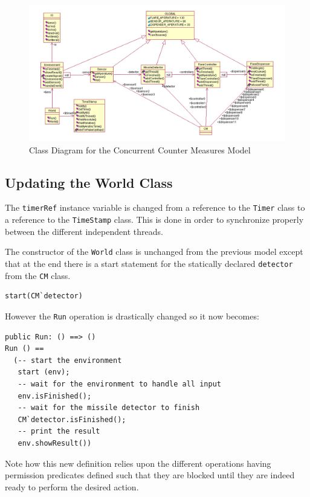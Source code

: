 \documentclass{overturerepchap}
\begin{document}
\begin{figure}
\begin{center}
\includegraphics[width=\textwidth]{figures/concurCMclassdiag.png}
\end{center}
\caption{Class Diagram for the Concurrent Counter Measures Model\label{fig:classdiagconcur}}
\end{figure}

\subsection{Updating the World Class}

The \texttt{timerRef} instance variable is changed from a reference to 
the \texttt{Timer} class to a reference to the \texttt{TimeStamp} class.
This is done in order to synchronize properly between the different 
independent threads.

The constructor of the \texttt{World} class is unchanged from the 
previous model except that at the end there is a start statement
for the statically declared \texttt{detector} from the \texttt{CM} class.

\begin{lstlisting}
start(CM`detector)
\end{lstlisting}

However the \texttt{Run} operation is drastically changed so it now becomes:

\begin{lstlisting}
public Run: () ==> ()
Run () == 
  (-- start the environment
   start (env);
   -- wait for the environment to handle all input
   env.isFinished();
   -- wait for the missile detector to finish
   CM`detector.isFinished();
   -- print the result
   env.showResult())
\end{lstlisting}

Note how this new definition relies upon the different operations
having permission predicates defined such that they are blocked until
they are indeed ready to perform the desired action.
\end{document}
